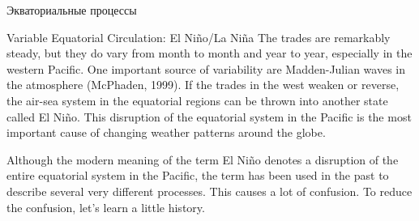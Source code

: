 \begin{chapter}{Экваториальные процессы}
\begin{section}{Variable Equatorial Circulation: El Ni\~{n}o/La Ni\~{n}a}
The trades are
remarkably steady, but they do vary from month to month and year to
year, especially in the western Pacific. One important source of
variability are Madden-Julian waves in the atmosphere (McPhaden,
1999). If the trades in the west weaken or reverse, the air-sea system
in the equatorial regions can be thrown into another state called El
Ni\~{n}o. This disruption of the equatorial system in the Pacific is
the most important cause of changing weather patterns around the
globe.
%

Although the modern meaning of the term El Ni\~{n}o denotes a
disruption of the entire equatorial system in the Pacific, the term
has been used in the past to describe several very different
processes. This causes a lot of confusion. To reduce the confusion,
let's learn a little history.
%


\end{section}
\end{chapter}
